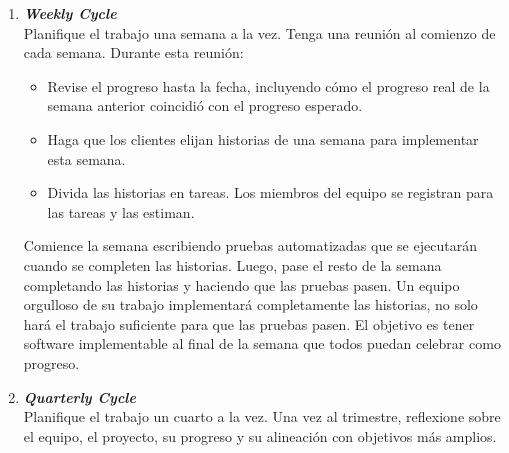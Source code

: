 \begin{spacing}{1.5}
\begin{enumerate}
				Dé a las historias nombres cortos además de una breve prosa o una descripción gráfica. Escriba las historias en fichas y colóquelas en una pared que pase con frecuencia. La Figura \ref{figure:chaperII_6}  es una tarjeta de muestra de una historia que deseo que implemente mi programa de escáner. Cada intento que he visto de computarizar historias no ha logrado proporcionar una fracción del valor de tener cartas reales en una pared real. Si necesita informar el progreso a otras partes de la organización en un formato familiar, traduzca las tarjetas a ese formato periódicamente \cite{chap2_extreme_programming}.
				
				\begin{figure}[H]
					\centering
					\texttt{[image: xp\_5]}
					\caption {\centering \small{Tarjeta de historia de usuario}} \label{figure:chaperII_6}
					\small {Fuente: ``Extreme Programming Explained: Embrace Change, 2nd Ed." por Beck, Kent and Andres - Cynthia, 2004, Copyright by Addison-Wesley Professional.}
				\end{figure}
				
				\item \textit{\textbf{Weekly Cycle}}\\
				Planifique el trabajo una semana a la vez. Tenga una reunión al comienzo de cada semana. Durante esta reunión:
				\begin{itemize}
					\item Revise el progreso hasta la fecha, incluyendo cómo el progreso real de la semana anterior coincidió con el progreso esperado.
					\item Haga que los clientes elijan historias de una semana para implementar esta semana.
					\item Divida las historias en tareas. Los miembros del equipo se registran para las tareas y las estiman.
				\end{itemize}
				Comience la semana escribiendo pruebas automatizadas que se ejecutarán cuando se completen las historias. Luego, pase el resto de la semana completando las historias y haciendo que las pruebas pasen. Un equipo orgulloso de su trabajo implementará completamente las historias, no solo hará el trabajo suficiente para que las pruebas pasen. El objetivo es tener software implementable al final de la semana que todos puedan celebrar como progreso.
				\item \textit{\textbf{Quarterly Cycle}}\\
				Planifique el trabajo un cuarto a la vez. Una vez al trimestre, reflexione sobre el equipo, el proyecto, su progreso y su alineación con objetivos más amplios.
				

\end{enumerate}
\end{spacing}
